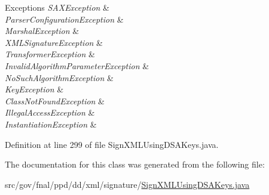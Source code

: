 \begin{DoxyExceptions}{Exceptions}
{\em S\-A\-X\-Exception} & \\
\hline
{\em Parser\-Configuration\-Exception} & \\
\hline
{\em Marshal\-Exception} & \\
\hline
{\em X\-M\-L\-Signature\-Exception} & \\
\hline
{\em Transformer\-Exception} & \\
\hline
{\em Invalid\-Algorithm\-Parameter\-Exception} & \\
\hline
{\em No\-Such\-Algorithm\-Exception} & \\
\hline
{\em Key\-Exception} & \\
\hline
{\em Class\-Not\-Found\-Exception} & \\
\hline
{\em Illegal\-Access\-Exception} & \\
\hline
{\em Instantiation\-Exception} & \\
\hline
\end{DoxyExceptions}


Definition at line 299 of file Sign\-X\-M\-L\-Using\-D\-S\-A\-Keys.\-java.



The documentation for this class was generated from the following file\-:\begin{DoxyCompactItemize}
\item 
src/gov/fnal/ppd/dd/xml/signature/\hyperlink{SignXMLUsingDSAKeys_8java}{Sign\-X\-M\-L\-Using\-D\-S\-A\-Keys.\-java}\end{DoxyCompactItemize}
